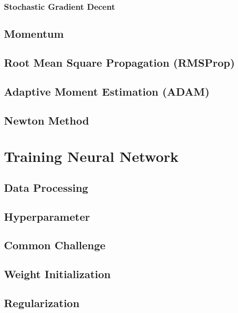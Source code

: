 \documentclass[10pt]{article}
\begin{document}
\subsubsection{Stochastic Gradient Decent}

\subsection{Momentum}

\subsection{Root Mean Square Propagation (RMSProp)}

\subsection{Adaptive Moment Estimation (ADAM)}

\subsection{Newton Method}

\section{Training Neural Network}

\subsection{Data Processing}

\subsection{Hyperparameter}

\subsection{Common Challenge}

\subsection{Weight Initialization}

\subsection{Regularization}
\end{document}
